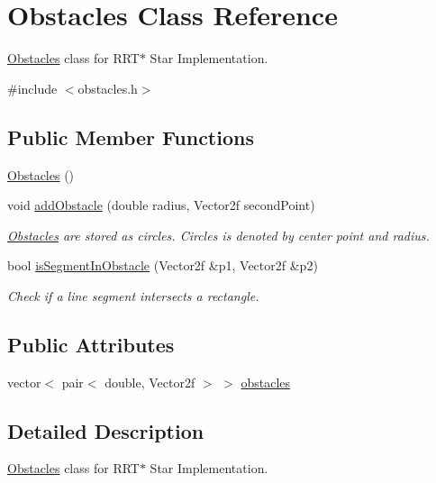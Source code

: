 \hypertarget{classObstacles}{}\section{Obstacles Class Reference}
\label{classObstacles}


\hyperlink{classObstacles}{Obstacles} class for R\+R\+T$\ast$ Star Implementation.  




{\ttfamily \#include $<$obstacles.\+h$>$}

\subsection*{Public Member Functions}
\begin{DoxyCompactItemize}
\item 
\hyperlink{classObstacles_a51c7f97c28a251ab75d711b23d9fe8e1}{Obstacles} ()
\item 
void \hyperlink{classObstacles_a10c9eb69030b13eacf1b46e69d02916f}{add\+Obstacle} (double radius, Vector2f second\+Point)
\begin{DoxyCompactList}\small\item\em \hyperlink{classObstacles}{Obstacles} are stored as circles. Circles is denoted by center point and radius. \end{DoxyCompactList}\item 
bool \hyperlink{classObstacles_a06f3d51fcbd0e67bc70794d799cb0aea}{is\+Segment\+In\+Obstacle} (Vector2f \&p1, Vector2f \&p2)
\begin{DoxyCompactList}\small\item\em Check if a line segment intersects a rectangle. \end{DoxyCompactList}\end{DoxyCompactItemize}
\subsection*{Public Attributes}
\begin{DoxyCompactItemize}
\item 
vector$<$ pair$<$ double, Vector2f $>$ $>$ \hyperlink{classObstacles_a0ca6fb1a3c0466239c2932f4f0ea63d1}{obstacles}
\end{DoxyCompactItemize}


\subsection{Detailed Description}
\hyperlink{classObstacles}{Obstacles} class for R\+R\+T$\ast$ Star Implementation. 

